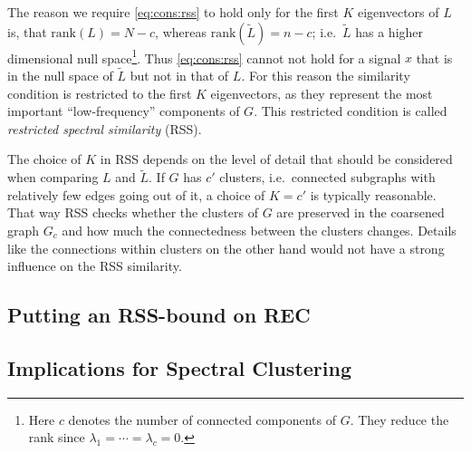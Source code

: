 The reason we require \cref{eq:cons:rss} to hold only for the first $K$ eigenvectors of $L$ is, that $\text{rank}(L) = N - c$, whereas $\text{rank}(\widetilde{L}) = n - c$;
i.e.\ $\widetilde{L}$ has a higher dimensional null space\footnote{%
	Here $c$ denotes the number of connected components of $G$.
	They reduce the rank since $\lambda_1 = \cdots = \lambda_c = 0$.
}.
Thus \cref{eq:cons:rss} cannot not hold for a signal $x$ that is in the null space of $\widetilde{L}$ but not in that of $L$.
For this reason the similarity condition is restricted to the first $K$ eigenvectors, as they represent the most important ``low-frequency'' components of $G$.
This restricted condition is called \textit{restricted spectral similarity} (RSS).

The choice of $K$ in RSS depends on the level of detail that should be considered when comparing $L$ and $\widetilde{L}$.
If $G$ has $c'$ clusters, i.e.\ connected subgraphs with relatively few edges going out of it, a choice of $K = c'$ is typically reasonable.
That way RSS checks whether the clusters of $G$ are preserved in the coarsened graph $G_c$ and how much the connectedness between the clusters changes.
Details like the connections within clusters on the other hand would not have a strong influence on the RSS similarity.

\subsection{Putting an RSS-bound on REC}%
\label{sec:cons:bound}

\subsection{Implications for Spectral Clustering}%
\label{sec:cons:sc}
